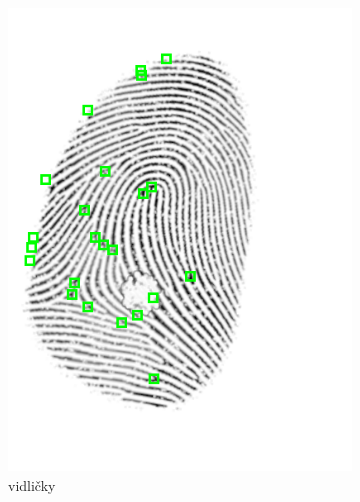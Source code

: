   \begin{figure}[h]
    \centering
    \begin{subfigure}[b]{0.3\linewidth}
      \includegraphics[width=\linewidth]{obrazky-figures/bifurcations.png}
      \caption{vidličky}
    \end{subfigure}
    \hfill
    \begin{subfigure}[b]{0.3\linewidth}

\end{subfigure}
\end{figure}
